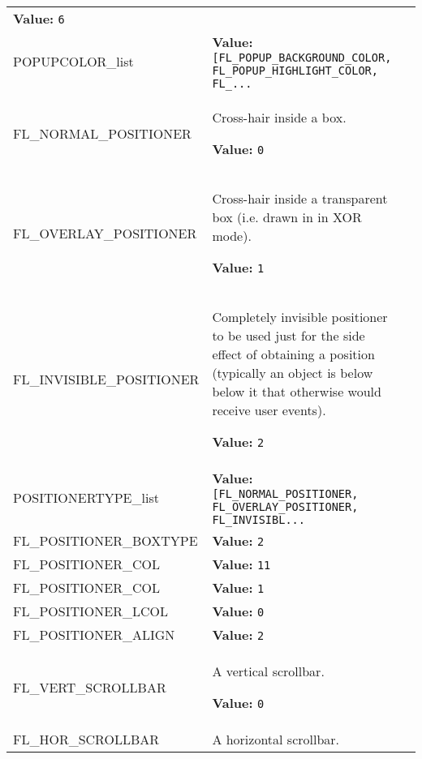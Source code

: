\begin{longtable}{|p{\varnamewidth}|p{\vardescrwidth}|l}
\textbf{Value:} 
{\tt 6}&\\
\cline{1-2}
\raggedright P\-O\-P\-U\-P\-C\-O\-L\-O\-R\-\_\-l\-i\-s\-t\- & \raggedright \textbf{Value:} 
{\tt [FL\_POPUP\_BACKGROUND\_COLOR, FL\_POPUP\_HIGHLIGHT\_COLOR, FL\_\texttt{...}}&\\
\cline{1-2}
\raggedright F\-L\-\_\-N\-O\-R\-M\-A\-L\-\_\-P\-O\-S\-I\-T\-I\-O\-N\-E\-R\- & \raggedright Cross-hair inside a box.

\textbf{Value:} 
{\tt 0}&\\
\cline{1-2}
\raggedright F\-L\-\_\-O\-V\-E\-R\-L\-A\-Y\-\_\-P\-O\-S\-I\-T\-I\-O\-N\-E\-R\- & \raggedright Cross-hair inside a transparent box (i.e. drawn in in XOR mode).

\textbf{Value:} 
{\tt 1}&\\
\cline{1-2}
\raggedright F\-L\-\_\-I\-N\-V\-I\-S\-I\-B\-L\-E\-\_\-P\-O\-S\-I\-T\-I\-O\-N\-E\-R\- & \raggedright Completely invisible positioner to be used just for the side effect of
obtaining a position (typically an object is below below it that otherwise
would receive user events).

\textbf{Value:} 
{\tt 2}&\\
\cline{1-2}
\raggedright P\-O\-S\-I\-T\-I\-O\-N\-E\-R\-T\-Y\-P\-E\-\_\-l\-i\-s\-t\- & \raggedright \textbf{Value:} 
{\tt [FL\_NORMAL\_POSITIONER, FL\_OVERLAY\_POSITIONER, FL\_INVISIBL\texttt{...}}&\\
\cline{1-2}
\raggedright F\-L\-\_\-P\-O\-S\-I\-T\-I\-O\-N\-E\-R\-\_\-B\-O\-X\-T\-Y\-P\-E\- & \raggedright \textbf{Value:} 
{\tt 2}&\\
\cline{1-2}
\raggedright F\-L\-\_\-P\-O\-S\-I\-T\-I\-O\-N\-E\-R\-\_\-C\-O\-L\-1\- & \raggedright \textbf{Value:} 
{\tt 11}&\\
\cline{1-2}
\raggedright F\-L\-\_\-P\-O\-S\-I\-T\-I\-O\-N\-E\-R\-\_\-C\-O\-L\-2\- & \raggedright \textbf{Value:} 
{\tt 1}&\\
\cline{1-2}
\raggedright F\-L\-\_\-P\-O\-S\-I\-T\-I\-O\-N\-E\-R\-\_\-L\-C\-O\-L\- & \raggedright \textbf{Value:} 
{\tt 0}&\\
\cline{1-2}
\raggedright F\-L\-\_\-P\-O\-S\-I\-T\-I\-O\-N\-E\-R\-\_\-A\-L\-I\-G\-N\- & \raggedright \textbf{Value:} 
{\tt 2}&\\
\cline{1-2}
\raggedright F\-L\-\_\-V\-E\-R\-T\-\_\-S\-C\-R\-O\-L\-L\-B\-A\-R\- & \raggedright A vertical scrollbar.

\textbf{Value:} 
{\tt 0}&\\
\cline{1-2}
\raggedright F\-L\-\_\-H\-O\-R\-\_\-S\-C\-R\-O\-L\-L\-B\-A\-R\- & \raggedright A horizontal scrollbar.


\end{longtable}
